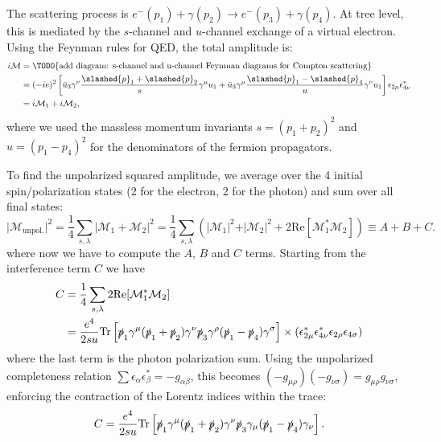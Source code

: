 The scattering process is $e^-(p_1) + \gamma(p_2) \to e^-(p_3) + \gamma(p_4)$. At tree level, this is mediated by the $s$-channel and $u$-channel exchange of a virtual electron. Using the Feynman rules for QED, the total amplitude is:
\[
    \begin{aligned}
        i \mathcal{M} & = \text{\TODO{add diagram: s-channel and u-channel Feynman diagrams for Compton scattering}}                                                                                                                                 \\
                      & = (-ie)^2 \left[ \bar{u}_3 \gamma^{\nu} \frac{\slashed{p}_1 + \slashed{p}_2}{s} \gamma^{\mu} u_1 + \bar{u}_3 \gamma^{\mu} \frac{\slashed{p}_1 - \slashed{p}_4}{u} \gamma^{\nu} u_1 \right] \epsilon_{2\mu} \epsilon_{4\nu}^* \\
                      & = i \mathcal{M}_1 + i \mathcal{M}_2,
    \end{aligned}
\]
where we used the massless momentum invariants $s = (p_1+p_2)^2$ and $u = (p_1-p_4)^2$ for the denominators of the fermion propagators.

To find the unpolarized squared amplitude, we average over the 4 initial spin/polarization states (2 for the electron, 2 for the photon) and sum over all final states:
\[
    \vert \mathcal{M}_{\text{unpol.}} \vert^2 = \frac{1}{4} \sum_{s, \lambda} \vert \mathcal{M}_1 + \mathcal{M}_2 \vert^2 = \frac{1}{4} \sum_{s, \lambda} \left( \vert \mathcal{M}_1 \vert^2 + \vert \mathcal{M}_2 \vert^2 + 2\text{Re}[\mathcal{M}_1^* \mathcal{M}_2] \right) \equiv A + B + C.
\]
where now we have to compute the \(A\), \(B\) and \(C\) terms. Starting from the interference term \(C\) we have
\[
    \begin{aligned}
        C & = \frac{1}{4} \sum_{s, \lambda} 2\text{Re}[\mathcal{M}_1^* \mathcal{M}_2]                                                                                                                                                                                                \\
          & = \frac{e^4}{2 s u} \text{Tr}\left[ \slashed{p}_1 \gamma^\mu (\slashed{p}_1 + \slashed{p}_2) \gamma^\nu \slashed{p}_3 \gamma^\rho (\slashed{p}_1 - \slashed{p}_4) \gamma^\sigma \right] \times (\epsilon_{2\mu}^* \epsilon_{4\nu}^* \epsilon_{2\rho} \epsilon_{4\sigma})
    \end{aligned}
\]
where the last term is the photon polarization sum. Using the unpolarized completeness relation $\sum \epsilon_\alpha \epsilon_\beta^* = -g_{\alpha\beta}$, this becomes \( (-g_{\mu \rho}) (-g_{\nu \sigma}) = g_{\mu \rho} g_{\nu \sigma} \), enforcing the contraction of the Lorentz indices within the trace:
\[
    C = \frac{e^4}{2 s u} \text{Tr}\left[ \slashed{p}_1 \gamma^\mu (\slashed{p}_1 + \slashed{p}_2) \gamma^\nu \slashed{p}_3 \gamma_\mu (\slashed{p}_1 - \slashed{p}_4) \gamma_\nu \right].
\]

